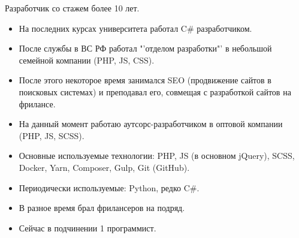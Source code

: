 \documentclass[10pt]{tpl/developercv} %
\begin{document}
\vspace{0.5cm}



\begin{minipage}[t]{0.55\textwidth} %
	\vspace{-\baselineskip} %


	Разработчик со стажем более 10 лет.
  \bigskip
  \small{
    \begin{itemize}[leftmargin=1pt]
      \item На последних курсах университета работал C\# разработчиком.
      \item После службы в ВС РФ работал "'отделом разработки"' в небольшой семейной компании (PHP, JS, CSS).
      \item После этого некоторое время занимался SEO (продвижение сайтов в поисковых системах) и преподавал его, совмещая с разработкой сайтов на фрилансе.
      \item На данный момент работаю аутсорс-разработчиком в оптовой компании (PHP, JS, SCSS).
      \item Основные используемые технологии: PHP, JS (в основном jQuery), SCSS, Docker, Yarn, Composer, Gulp, {Git (GitHub)}.
      \item Периодически используемые: Python, редко C\#.
      \item В разное время брал фрилансеров на подряд.
      \item Сейчас в подчинении 1 программист.
    \end{itemize}
  }
\end{minipage}
\hfill %
\begin{minipage}[t]{0.35\textwidth} %
	 \vspace{-\baselineskip} %


\end{minipage}
\end{document}
